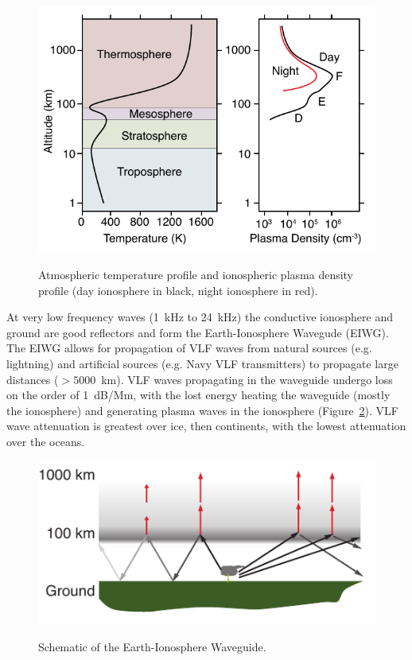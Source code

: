 \begin{figure}[ht!]
	\centering
	\includegraphics[scale=1]{Introduction/Figures/ionosphere.pdf}\\
	\caption{Atmospheric temperature profile and ionospheric plasma density profile (day ionosphere in black, night ionosphere in red).
		     }
	\label{intro:fig:ionosphere}
\end{figure}

At very low frequency waves (1~kHz to 24~kHz) the conductive ionosphere and ground are good reflectors and form the Earth-Ionosphere Wavegude (EIWG).
The EIWG allows for propagation of VLF waves from natural sources (e.g. lightning) and artificial sources (e.g. Navy VLF transmitters) to propagate large distances ($>5000$~km).
VLF waves propagating in the waveguide undergo loss on the order of 1~dB/Mm, with the lost energy  heating the waveguide (mostly the ionosphere) and generating plasma waves in the ionosphere (Figure~\ref{intro:fig:eiwg}).
VLF wave attenuation is greatest over ice, then continents, with the lowest attenuation over the oceans.

\begin{figure}[ht!]
	\centering
	\includegraphics[scale=1]{Introduction/Figures/eiwg.pdf}\\
	\caption{Schematic of the Earth-Ionosphere Waveguide.}
	\label{intro:fig:eiwg}
\end{figure}

